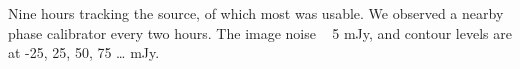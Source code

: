 Nine hours tracking the source, of which most was usable. We observed a nearby phase calibrator every two hours. The image noise ~ 5 mJy, and contour levels are at -25, 25, 50, 75 … mJy. 